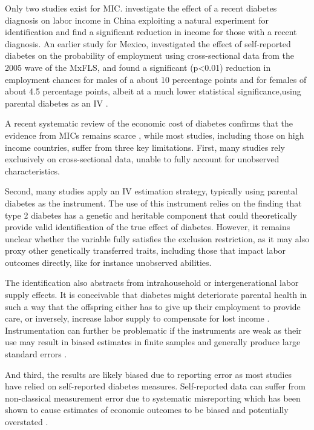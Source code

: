 \documentclass[12pt,english,british]{article}
\begin{document}
Only two studies exist for \ac{MIC}. \citet{Liu2014} investigate the effect of a recent diabetes diagnosis on labor income
in China exploiting a natural experiment for identification and find a
significant reduction in income for those with a recent diagnosis.
An earlier study for Mexico, investigated the effect of self-reported
diabetes on the probability of employment using cross-sectional data from the
2005 wave of the \ac{MxFLS}, and found a significant (p<0.01) reduction
in employment chances for males of a about 10 percentage points and
for females of about 4.5 percentage points, albeit at a much lower
statistical significance,using parental diabetes as an \ac{IV} \citep{Seuring2015}.

A recent systematic review of the economic cost of diabetes confirms that the evidence from \ac{MICs} remains  scarce \citep{Seuring2015a}, while most studies, including those on high income countries, suffer from three key limitations. First, many studies rely exclusively on cross-sectional data, unable to fully account for unobserved characteristics. 

Second,  many studies apply an \ac{IV} estimation  strategy, typically using parental diabetes as the instrument. 
The use of this instrument relies on the finding that type 2 diabetes has a genetic and heritable component that could theoretically provide valid identification of the true effect of diabetes. However, it remains unclear whether the variable fully satisfies the exclusion restriction, as it may also proxy other genetically transferred traits, including those that impact labor outcomes directly, like for instance unobserved abilities.

The identification also abstracts from intrahousehold or intergenerational labor supply effects. It is conceivable that diabetes might deteriorate parental health in such a way that the offspring either has to give
up their employment to provide care, or inversely, increase labor supply to compensate for lost income \citep{Seuring2015}. Instrumentation can further be problematic if the instruments are weak as their use may result in biased estimates in finite samples and generally produce large standard errors \citep{Bound1995}. 

And third, the results are likely biased due to reporting error as most studies have relied on self-reported diabetes measures. Self-reported data can suffer from non-classical measurement error
due to systematic misreporting which has been shown to cause estimates
of economic outcomes to be biased and potentially overstated \citep{Cawley2015,ONeill2013,Perks2015}.
\end{document}
